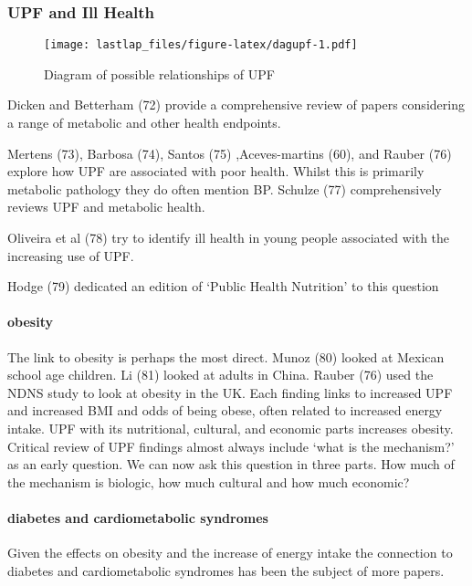\documentclass[
]{article}
\begin{document}
\hypertarget{upf-and-ill-health}{%
\subsubsection{UPF and Ill Health}\label{upf-and-ill-health}}

\begin{figure}
\centering
\texttt{[image: lastlap\_files/figure-latex/dagupf-1.pdf]}
\caption{Diagram of possible relationships of UPF}
\end{figure}

Dicken and Betterham (72) provide a comprehensive review of papers
considering a range of metabolic and other health endpoints.

Mertens (73), Barbosa (74), Santos (75) ,Aceves-martins (60), and Rauber
(76) explore how UPF are associated with poor health. Whilst this is
primarily metabolic pathology they do often mention BP. Schulze (77)
comprehensively reviews UPF and metabolic health.

Oliveira et al (78) try to identify ill health in young people
associated with the increasing use of UPF.

Hodge (79) dedicated an edition of `Public Health Nutrition' to this
question

\hypertarget{obesity}{%
\paragraph{obesity}\label{obesity}}

The link to obesity is perhaps the most direct. Munoz (80) looked at
Mexican school age children. Li (81) looked at adults in China. Rauber
(76) used the NDNS study to look at obesity in the UK. Each finding
links to increased UPF and increased BMI and odds of being obese, often
related to increased energy intake. UPF with its nutritional, cultural,
and economic parts increases obesity. Critical review of UPF findings
almost always include `what is the mechanism?' as an early question. We
can now ask this question in three parts. How much of the mechanism is
biologic, how much cultural and how much economic?

\hypertarget{diabetes-and-cardiometabolic-syndromes}{%
\paragraph{diabetes and cardiometabolic
syndromes}\label{diabetes-and-cardiometabolic-syndromes}}

Given the effects on obesity and the increase of energy intake the
connection to diabetes and cardiometabolic syndromes has been the
subject of more papers.
\end{document}
